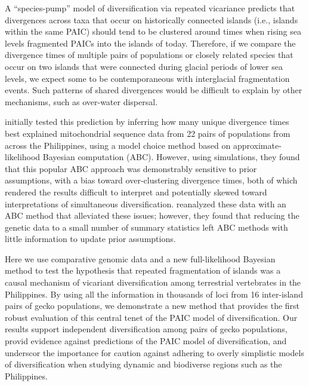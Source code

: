 A ``species-pump'' model of diversification via repeated vicariance predicts
that divergences across taxa that occur on historically connected islands
(i.e., islands within the same PAIC) should tend to be clustered around times
when rising sea levels fragmented PAICs into the islands of today.
Therefore, if we compare the divergence times of multiple pairs of populations
or closely related species that occur on two islands that were connected during
glacial periods of lower sea levels, we expect some to be contemporaneous
with interglacial fragmentation events.
Such patterns of shared divergences would be difficult to explain by
other mechanisms, such as over-water dispersal.

\citet{Oaks2012} initially tested this prediction by inferring how many unique
divergence times best explained mitochondrial sequence data from 22 pairs of
populations from across the Philippines, using a model choice method based on
approximate-likelihood Bayesian computation (ABC).
However, using simulations, they found that this popular ABC approach was
demonstrably sensitive to prior assumptions, with a bias toward over-clustering
divergence times, both of which rendered the results difficult to interpret
and potentially skewed toward interpretations of simultaneous diversification.
\citet{Oaks2014dpp} reanalyzed these data with an ABC method that alleviated
these issues; however, they found that reducing the genetic data to a small
number of summary statistics left ABC methods with little information to update
prior assumptions.

Here we use comparative genomic data and a new full-likelihood Bayesian method
to test the hypothesis that repeated fragmentation of islands was a causal
mechanism of vicariant diversification among terrestrial vertebrates in the
Philippines.
By using all the information in thousands of loci from 16 inter-island
pairs of gecko populations,
we demonstrate a new method that provides the first robust evaluation of
this central tenet of the PAIC model of diversification.
Our results support independent diversification among pairs of gecko
populations,
provid evidence against  predictions of
the PAIC model of diversification,
and underscor the importance for caution against adhering to
overly simplistic models of diversification  when studying dynamic and biodiverse regions such as the
Philippines.


